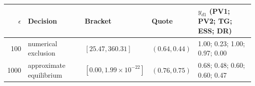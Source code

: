 \begin{tabular}{@{}rllll@{}}
\toprule
$\epsilon$ & Decision & Bracket & Quote & $y_{d1}$ (PV1; PV2; TG; ESS; DR)\\
\midrule
100 & numerical exclusion & $[25.47,360.31]$ & $(0.64,0.44)$ & 1.00; 0.23; 1.00; 0.97; 0.00\\
1000 & approximate equilibrium & $[0.00,1.99\times10^{-22}]$ & $(0.76,0.75)$ & 0.68; 0.48; 0.60; 0.60; 0.47\\
\bottomrule
\end{tabular}
